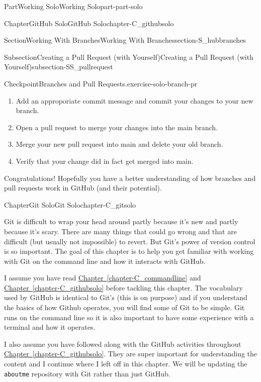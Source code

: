 \documentclass[oneside,10pt,]{book}
\newcommand{\xreffont}{\relax}
\newcommand{\mono}[1]{\texttt{#1}}
\begin{document}
\begin{partptx}{Part}{Working Solo}{}{Working Solo}{}{}{part-part-solo}
\begin{chapterptx}{Chapter}{GitHub Solo}{}{GitHub Solo}{}{}{chapter-C_githubsolo}
\begin{sectionptx}{Section}{Working With Branches}{}{Working With Branches}{}{}{section-S_hubbranches}
\begin{subsectionptx}{Subsection}{Creating a Pull Request (with Yourself)}{}{Creating a Pull Request (with Yourself)}{}{}{subsection-SS_pullrequest}
\begin{inlineexercise}{Checkpoint}{Branches and Pull Requests.}{exercise-solo-branch-pr}
\begin{enumerate}[font=\bfseries,label=(\alph*),ref=\alph*]
\item{}Add an approporiate commit message and commit your changes to your new branch.%
\item{}Open a pull request to merge your changes into the main branch.%
\item{}Merge your new pull request into main and delete your old branch.%
\item{}Verify that your change did in fact get merged into main.%
\end{enumerate}%
\end{inlineexercise}%
\end{subsectionptx}
\begin{conclusion}{}%
Congratulations! Hopefully you have a better understanding of how branches and pull requests work in GitHub (and their potential).%
\end{conclusion}%
\end{sectionptx}
\end{chapterptx}
%
\typeout{************************************************}
\typeout{************************************************}
%
\begin{chapterptx}{Chapter}{Git Solo}{}{Git Solo}{}{}{chapter-C_gitsolo}
\renewcommand*{\chaptername}{Chapter}
%
%
\begin{introduction}{}%
Git is difficult to wrap your head around partly because it's new and partly because it's scary. There are many things that could go wrong and that are difficult (but usually not impossible) to revert. But Git's power of version control is so important. The goal of this chapter is to help you get familiar with working with Git on the command line and how it interacts with GitHub.%
\par
I assume you have read \hyperref[chapter-C_commandline]{Chapter~{\xreffont\ref{chapter-C_commandline}}} and \hyperref[chapter-C_githubsolo]{Chapter~{\xreffont\ref{chapter-C_githubsolo}}} before tackling this chapter. The vocabulary used by GitHub is identical to Git's (this is on purpose) and if you understand the basics of how Github operates, you will find some of Git to be simple. Git runs on the command line so it is also important to have some experience with a terminal and how it operates.%
\par
I also assume you have followed along with the GitHub activities throughout \hyperref[chapter-C_githubsolo]{Chapter~{\xreffont\ref{chapter-C_githubsolo}}}. They are super important for understanding the content and I continue where I left off in this chapter. We will be updating the \mono{aboutme} repository with Git rather than just GitHub.%

\end{introduction}
\end{chapterptx}
\end{partptx}
\end{document}
